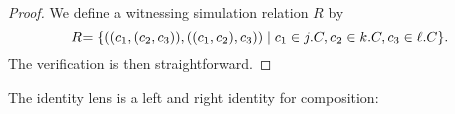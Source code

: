 \begin{defn}[$R$-similarity]
\begin{theorem}
\iffull
\begin{proof}
We define a witnessing simulation relation $R$ by
\[
\mathrel{R_{}} = \{((c_1,(c_2,c_3)), ((c_1,c_2),c_3))\mid  c_1\in j.C, c_2\in k.C, c_3\in \ell.C\}.
\]
The verification is then straightforward.
%
\end{proof}
\fi

\begin{lemma}
\iftext The identity lens is a left and right identity for composition: \fi
{}
\end{lemma}


\end{theorem}
\end{defn}
